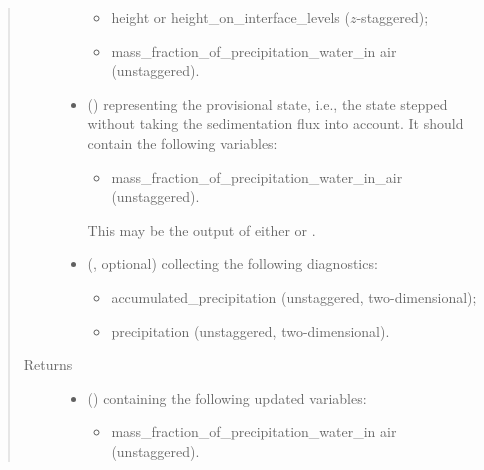 \documentclass[letterpaper,10pt,english]{sphinxmanual}
\begin{document}
\begin{fulllineitems}
\begin{fulllineitems}
\begin{quote}
\begin{description}
\begin{itemize}
\begin{itemize}
\item {} 
height or height\_on\_interface\_levels (\(z\)-staggered);

\item {} 
mass\_fraction\_of\_precipitation\_water\_in air (unstaggered).

\end{itemize}


\item {} 
 () \textendash{} 
{\hyperref[\detokenize{api:tasmania.storages.state_isentropic.StateIsentropic}]{}} representing the provisional state, i.e.,
the state stepped without taking the sedimentation flux into account.
It should contain the following variables:
\begin{itemize}
\item {} 
mass\_fraction\_of\_precipitation\_water\_in\_air (unstaggered).

\end{itemize}

This may be the output of either
{\hyperref[\detokenize{api:tasmania.dycore.prognostic_isentropic.PrognosticIsentropic.step_neglecting_vertical_advection}]{}} or
{\hyperref[\detokenize{api:tasmania.dycore.prognostic_isentropic.PrognosticIsentropic.step_coupling_physics_with_dynamics}]{}}.


\item {} 
 (, optional) \textendash{} 
{\hyperref[\detokenize{api:tasmania.storages.grid_data.GridData}]{}} collecting the following diagnostics:
\begin{itemize}
\item {} 
accumulated\_precipitation (unstaggered, two-dimensional);

\item {} 
precipitation (unstaggered, two-dimensional).

\end{itemize}


\end{itemize}

\item[{Returns}] \leavevmode
\begin{itemize}
\item {} 
 () \textendash{} {\hyperref[\detokenize{api:tasmania.storages.state_isentropic.StateIsentropic}]{}} containing the following updated variables:
\begin{itemize}
\item {} 
mass\_fraction\_of\_precipitation\_water\_in air (unstaggered).


\end{itemize}
\end{itemize}
\end{description}
\end{quote}
\end{fulllineitems}
\end{fulllineitems}
\end{document}
